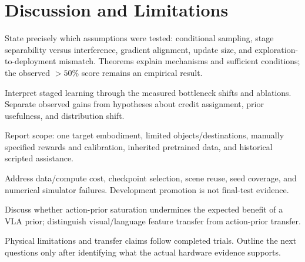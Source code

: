 \section{Discussion and Limitations}\label{sec:discussion}
\begin{outline}
\item State precisely which assumptions were tested: conditional sampling, stage separability versus interference, gradient alignment, update size, and exploration-to-deployment mismatch. Theorems explain mechanisms and sufficient conditions; the observed $>50\%$ score remains an empirical result.
\item Interpret staged learning through the measured bottleneck shifts and ablations. Separate observed gains from hypotheses about credit assignment, prior usefulness, and distribution shift.
\item Report scope: one target embodiment, limited objects/destinations, manually specified rewards and calibration, inherited pretrained data, and historical scripted assistance.
\item Address data/compute cost, checkpoint selection, scene reuse, seed coverage, and numerical simulator failures. Development promotion is not final-test evidence.
\item Discuss whether action-prior saturation undermines the expected benefit of a VLA prior; distinguish visual/language feature transfer from action-prior transfer.
\item Physical limitations and transfer claims follow completed trials. Outline the next questions only after identifying what the actual hardware evidence supports.
\end{outline}
